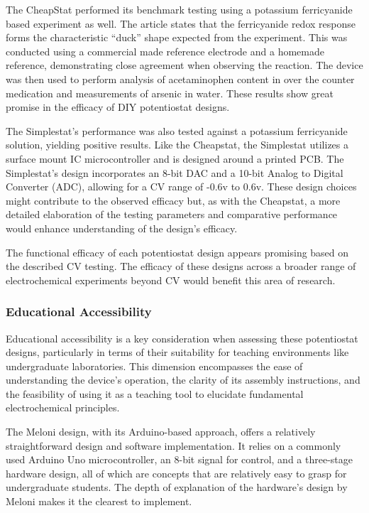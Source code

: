 \documentclass{article}
\begin{document}
The CheapStat performed its benchmark testing using a potassium ferricyanide based experiment as well. The article states that the ferricyanide redox response forms the characteristic ``duck'' shape expected from the experiment. This was conducted using a commercial made reference electrode and a homemade reference, demonstrating close agreement when observing the reaction. The device was then used to perform analysis of acetaminophen content in over the counter medication and measurements of arsenic in water. These results show great promise in the efficacy of DIY potentiostat designs.


The Simplestat's performance was also tested against a potassium ferricyanide solution, yielding positive results. Like the Cheapstat, the Simplestat utilizes a surface mount IC microcontroller and is designed around a printed PCB. The Simplestat's design incorporates an 8-bit DAC and a 10-bit Analog to Digital Converter (ADC), allowing for a CV range of -0.6v to 0.6v. These design choices might contribute to the observed efficacy but, as with the Cheapstat, a more detailed elaboration of the testing parameters and comparative performance would enhance understanding of the design's efficacy.


The functional efficacy of each potentiostat design appears promising based on the described CV testing. The efficacy of these designs across a broader range of electrochemical experiments beyond CV would benefit this area of research.


\subsubsection*{Educational Accessibility}
Educational accessibility is a key consideration when assessing these potentiostat designs, particularly in terms of their suitability for teaching environments like undergraduate laboratories. This dimension encompasses the ease of understanding the device's operation, the clarity of its assembly instructions, and the feasibility of using it as a teaching tool to elucidate fundamental electrochemical principles.


The Meloni design, with its Arduino-based approach, offers a relatively straightforward design and software implementation. It relies on a commonly used Arduino Uno microcontroller, an 8-bit signal for control, and a three-stage hardware design, all of which are concepts that are relatively easy to grasp for undergraduate students. The depth of explanation of the hardware's design by Meloni makes it the clearest to implement.
\end{document}
